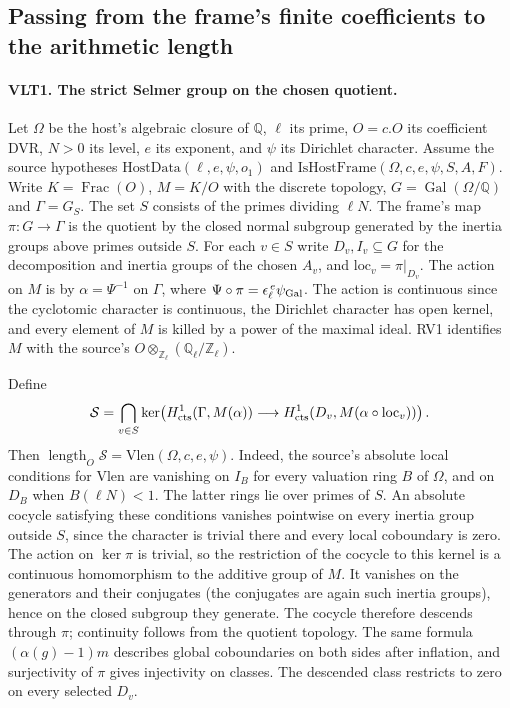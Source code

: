 \subsection{Passing from the frame's finite coefficients to the arithmetic length}
\label{sec:host-selmer-length}

\paragraph{VLT1. The strict Selmer group on the chosen quotient.}
\label{claim:VLT1}
Let $\Omega$ be the host's algebraic closure of $\mathbb Q$, $\ell$ its
prime, $O=c.O$ its coefficient DVR, $N>0$ its level, $e$ its exponent,
and $\psi$ its Dirichlet character. Assume the source hypotheses
$\mathrm{HostData}(\ell,e,\psi,o_1)$ and
$\mathrm{IsHostFrame}(\Omega,c,e,\psi,S,A,F)$.
Write $K=\operatorname{Frac}(O)$, $M=K/O$ with the discrete topology,
$G=\operatorname{Gal}(\Omega/\mathbb Q)$ and $\Gamma=G_S$.
The set $S$ consists of the primes dividing $\ell N$. The frame's map
$\pi:G\to\Gamma$ is the quotient by the closed normal subgroup generated
by the inertia groups above primes outside $S$. For each $v\in S$ write
$D_v,I_v\subseteq G$ for the decomposition and inertia groups of the
chosen $A_v$, and $\mathrm{loc}_v=\pi|_{D_v}$. The action on $M$ is by
$\alpha=\Psi^{-1}$ on $\Gamma$, where
$\Psi\circ\pi=\epsilon_\ell^{\,e}\psi_{\rm Gal}$.
The action is continuous since the cyclotomic character is continuous,
the Dirichlet character has open kernel, and every element of $M$ is
killed by a power of the maximal ideal. RV1 identifies $M$ with the
source's $O\otimes_{\mathbb Z_\ell}(\mathbb Q_\ell/\mathbb Z_\ell)$.

Define
\[
  \mathcal S=\bigcap_{v\in S}
   \ker\!\left(H^1_{\rm cts}(\Gamma,M(\alpha))\longrightarrow
   H^1_{\rm cts}(D_v,M(\alpha\circ\mathrm{loc}_v))\right).
\]
Then $\operatorname{length}_O\mathcal S=\mathrm{Vlen}(\Omega,c,e,\psi)$.
Indeed, the source's absolute local conditions for $\mathrm{Vlen}$ are
vanishing on $I_B$ for every valuation ring $B$ of $\Omega$, and on $D_B$
when $B(\ell N)<1$. The latter rings lie over primes of $S$.
An absolute cocycle satisfying these conditions vanishes pointwise on
every inertia group outside $S$, since the character is trivial there
and every local coboundary is zero. The action on $\ker\pi$ is trivial,
so the restriction of the cocycle to this kernel is a continuous
homomorphism to the additive group of $M$. It vanishes on the generators
and their conjugates (the conjugates are again such inertia groups),
hence on the closed subgroup they generate. The cocycle therefore
descends through $\pi$; continuity follows from the quotient topology.
The same formula $(\alpha(g)-1)m$ describes global coboundaries on both
sides after inflation, and surjectivity of $\pi$ gives injectivity on
classes. The descended class restricts to zero on every selected $D_v$.

